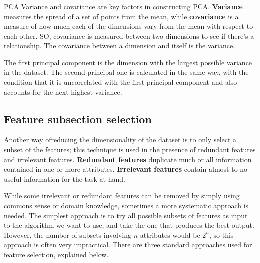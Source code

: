 \subsubsection{}{PCA}
Variance and covariance are key factors in constructing PCA. \textbf{Variance} measures the spread of a set of points from the mean, while \textbf{covariance} is a measure of how much each of the dimensions vary from the mean with respect to each other. SO, covariance is measured between two dimensions to see if there's a relationship. The covariance between a dimension and itself is the variance.

The first principal component is the dimension with the largest possible variance in the dataset. The second principal one is calculated in the same way, with the condition that it is uncorrelated with the first principal component and also accounts for the next highest variance.

\subsection{Feature subsection selection}

Another way ofreducing the dimensionality of the dataset is to only select a subset of the features; this technique is used in the presence of redundant features and irrelevant features. \textbf{Redundant features} duplicate much or all information contained in one or more attributes. \textbf{Irrelevant features} contain almost to no useful information for the task at hand.

While some irrelevant or redundant features can be removed by simply using commons sense or domain knowledge, sometimes a more systematic approach is needed. The simplest approach is to try all possible subsets of features as input to the algorithm we want to use, and take the one that produces the best output. However, the number of subsets involving $n$ attributes would be $2^n$, so this approach is often very impractical. There are three standard approaches used for feature selection, explained below.

